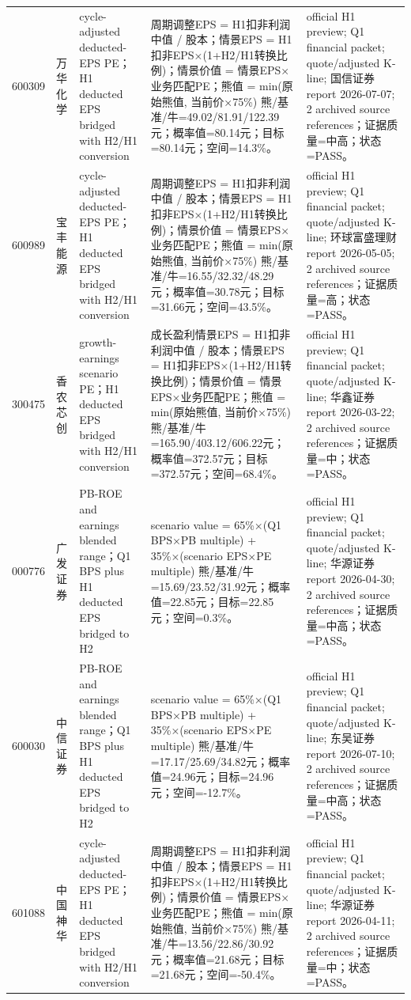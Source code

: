 \begin{longtable}{L{0.85cm}L{1.55cm}L{2.25cm}L{6.0cm}L{4.0cm}}
600309 & 万华化学 & cycle-adjusted deducted-EPS PE；H1 deducted EPS bridged with H2/H1 conversion & 周期调整EPS = H1扣非利润中值 / 股本；情景EPS = H1扣非EPS×(1+H2/H1转换比例)；情景价值 = 情景EPS×业务匹配PE；熊值 = min(原始熊值, 当前价×75\%) 熊/基准/牛=49.02/81.91/122.39元；概率值=80.14元；目标=80.14元；空间=14.3\%。 & official H1 preview; Q1 financial packet; quote/adjusted K-line; 国信证券 report 2026-07-07; 2 archived source references；证据质量=中高；状态=PASS。 \\
600989 & 宝丰能源 & cycle-adjusted deducted-EPS PE；H1 deducted EPS bridged with H2/H1 conversion & 周期调整EPS = H1扣非利润中值 / 股本；情景EPS = H1扣非EPS×(1+H2/H1转换比例)；情景价值 = 情景EPS×业务匹配PE；熊值 = min(原始熊值, 当前价×75\%) 熊/基准/牛=16.55/32.32/48.29元；概率值=30.78元；目标=31.66元；空间=43.5\%。 & official H1 preview; Q1 financial packet; quote/adjusted K-line; 环球富盛理财 report 2026-05-05; 2 archived source references；证据质量=高；状态=PASS。 \\
300475 & 香农芯创 & growth-earnings scenario PE；H1 deducted EPS bridged with H2/H1 conversion & 成长盈利情景EPS = H1扣非利润中值 / 股本；情景EPS = H1扣非EPS×(1+H2/H1转换比例)；情景价值 = 情景EPS×业务匹配PE；熊值 = min(原始熊值, 当前价×75\%) 熊/基准/牛=165.90/403.12/606.22元；概率值=372.57元；目标=372.57元；空间=68.4\%。 & official H1 preview; Q1 financial packet; quote/adjusted K-line; 华鑫证券 report 2026-03-22; 2 archived source references；证据质量=中；状态=PASS。 \\
000776 & 广发证券 & PB-ROE and earnings blended range；Q1 BPS plus H1 deducted EPS bridged to H2 & scenario value = 65\%×(Q1 BPS×PB multiple) + 35\%×(scenario EPS×PE multiple) 熊/基准/牛=15.69/23.52/31.92元；概率值=22.85元；目标=22.85元；空间=0.3\%。 & official H1 preview; Q1 financial packet; quote/adjusted K-line; 华源证券 report 2026-04-30; 2 archived source references；证据质量=中高；状态=PASS。 \\
600030 & 中信证券 & PB-ROE and earnings blended range；Q1 BPS plus H1 deducted EPS bridged to H2 & scenario value = 65\%×(Q1 BPS×PB multiple) + 35\%×(scenario EPS×PE multiple) 熊/基准/牛=17.17/25.69/34.82元；概率值=24.96元；目标=24.96元；空间=-12.7\%。 & official H1 preview; Q1 financial packet; quote/adjusted K-line; 东吴证券 report 2026-07-10; 2 archived source references；证据质量=中高；状态=PASS。 \\
601088 & 中国神华 & cycle-adjusted deducted-EPS PE；H1 deducted EPS bridged with H2/H1 conversion & 周期调整EPS = H1扣非利润中值 / 股本；情景EPS = H1扣非EPS×(1+H2/H1转换比例)；情景价值 = 情景EPS×业务匹配PE；熊值 = min(原始熊值, 当前价×75\%) 熊/基准/牛=13.56/22.86/30.92元；概率值=21.68元；目标=21.68元；空间=-50.4\%。 & official H1 preview; Q1 financial packet; quote/adjusted K-line; 华源证券 report 2026-04-11; 2 archived source references；证据质量=中；状态=PASS。 \\

\end{longtable}
